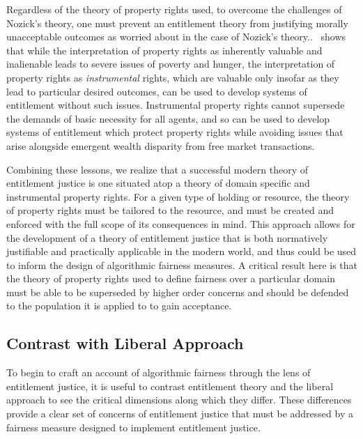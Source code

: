 Regardless of the theory of property rights used, to overcome the challenges of
Nozick's theory, one must prevent an entitlement theory from justifying morally
unacceptable outcomes as \cite{Fried_1995} worried about in the case of Nozick's
theory..~\cite{Sen_1988} shows that while the interpretation of
property rights as inherently valuable and inalienable leads to severe issues of
poverty and hunger, the interpretation of property rights as
\textit{instrumental} rights, which are valuable only insofar as they lead to
particular desired outcomes, can be used to develop systems of entitlement
without such issues. Instrumental property rights cannot supersede the demands
of basic necessity for all agents, and so can be used to develop systems of
entitlement which protect property rights while avoiding issues that arise
alongside emergent wealth disparity from free market transactions.

Combining these lessons, we realize that a successful modern theory of 
entitlement justice is one situated atop a theory of domain specific and 
instrumental property rights. For a given type of holding or resource, the
theory of property rights must be tailored to the resource, and must be created
and enforced with the full scope of its consequences in mind. This approach
allows for the development of a theory of entitlement justice that is both
normatively justifiable and practically applicable in the modern world, and
thus could be used to inform the design of algorithmic fairness measures. A
critical result here is that the theory of property rights used to define 
fairness over a particular domain must be able to be superseded by higher order
concerns and should be defended to the population it is applied to to gain 
acceptance.

\subsection{Contrast with Liberal Approach}

To begin to craft an account of algorithmic fairness through the lens of
entitlement justice, it is useful to contrast entitlement theory and the liberal
approach to see the critical dimensions along which they differ. These
differences provide a clear set of concerns of entitlement justice that must be
addressed by a fairness measure designed to implement entitlement justice.

